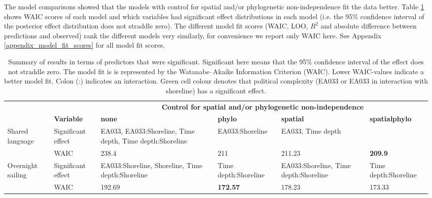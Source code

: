 \documentclass[unnumsec,webpdf,modern,medium]{oup-authoring-template}
\begin{document}
The model comparisons showed that the models with control for spatial and/or phylogenetic non-independence fit the data better. Table \ref{brms_results_summary} shows WAIC scores of each model and which variables had significant effect distributions in each model (i.e. the 95\% confidence interval of the posterior effect distribution does not straddle zero). The different model fit scores (WAIC, LOO,  $R^2$ and absolute difference between predictions and observed) rank the different models very similarly, for convenience we report only WAIC here. See Appendix \ref{appendix_model_fit_scores} for all model fit scores.



\begin{table}[ht]
\centering
\begin{tabular}{p{2cm}p{1.8cm}|p{2.4cm}p{2.4cm}p{2.4cm}p{2cm}}
  \toprule
&&  \multicolumn{4}{c}{\textbf{Control for spatial and/or phylogenetic non-independence}}\linebreak\\
 & \textbf{	Variable	} & \textbf{	none	} & \textbf{	phylo	} & \textbf{	spatial	} & \textbf{	spatialphylo	} 	\\
\midrule
\multirow{2}{*}{Shared language}
 	&	Significant effect	&	\cellcolor{spec_color_lightgreen!50} EA033, EA033:Shoreline, Time depth, Time depth:Shoreline	&	\cellcolor{spec_color_lightgreen!50} EA033:Shoreline	&	\cellcolor{spec_color_lightgreen!50} EA033, Time depth &		\\
		&	WAIC	&	238.4	&	211	&	211.23	&	 \textbf{209.9}	\\
  \midrule
\multirow{2}{*}{Overnight sailing}	&	Significant effect	&	\cellcolor{spec_color_lightgreen!50} EA033:Shoreline, Shoreline, Time depth:Shoreline	&	Time depth:Shoreline	&	\cellcolor{spec_color_lightgreen!50} EA033:Shoreline, Time depth:Shoreline &	Time depth:Shoreline		\\
	&	WAIC	&	192.69	&	\textbf{172.57}	&	178.23&	173.33		\\

   \bottomrule
\end{tabular}
\caption{Summary of results in terms of predictors that were significant. Significant here means that the 95\% confidence interval of the effect does not straddle zero. The model fit is is represented by the Watanabe–Akaike Information Criterion (WAIC). Lower WAIC-values indicate a better model fit. Colon (:) indicates an interaction. Green cell colour denotes that political complexity (EA033 or EA033 in interaction with shoreline) has a significant effect.} 
\label{brms_results_summary}
\end{table}
\end{document}
